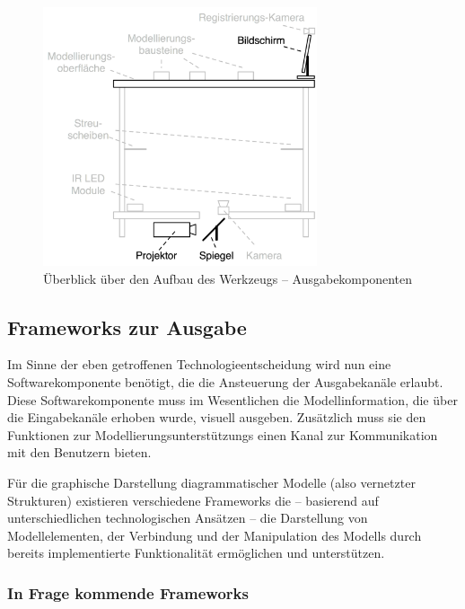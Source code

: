\begin{figure}[htbp]
	\centering
		\includegraphics[height=3in]{img/ImplementierungInput/TischSeitenansichtOutput.png}
	\caption{Überblick über den Aufbau des Werkzeugs -- Ausgabekomponenten}
	\label{fig:img_ImplementierungInput_TischSeitenansichtOutput}
\end{figure}


\subsection{Frameworks zur Ausgabe} %
\label{sub:frameworks_zur_ausgabe}

Im Sinne der eben getroffenen Technologieentscheidung wird nun eine Softwarekomponente benötigt, die die Ansteuerung der Ausgabekanäle erlaubt. Diese Softwarekomponente muss im Wesentlichen die Modellinformation, die über die Eingabekanäle erhoben wurde, visuell ausgeben. Zusätzlich muss sie den Funktionen zur Modellierungsunterstützungs einen Kanal zur Kommunikation mit den Benutzern bieten.

Für die graphische Darstellung diagrammatischer Modelle (also vernetzter Strukturen) existieren verschiedene Frameworks die -- basierend auf unterschiedlichen technologischen Ansätzen -- die Darstellung von Modellelementen, der Verbindung und der Manipulation des Modells durch bereits implementierte Funktionalität ermöglichen und unterstützen. 

\subsubsection{In Frage kommende Frameworks} %
\label{ssub:in_frage_kommende_frameworks}

